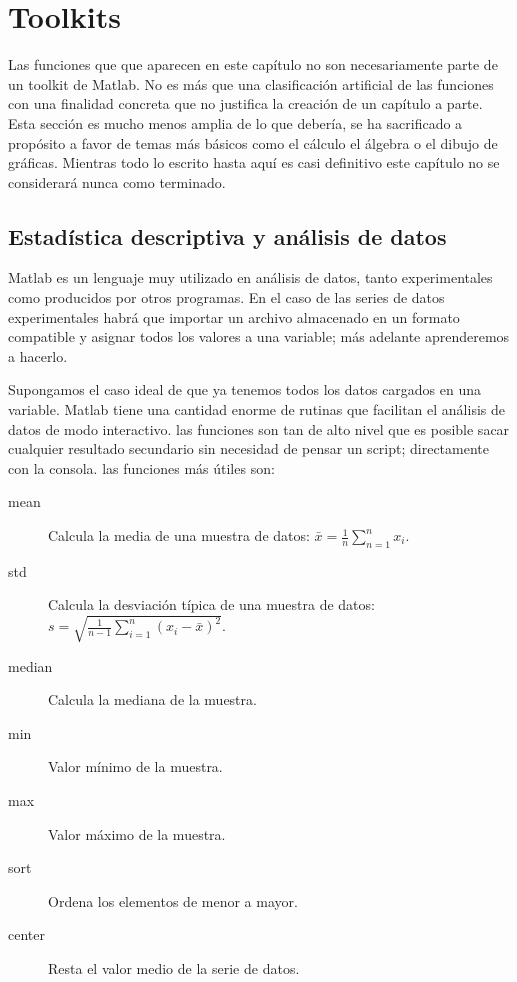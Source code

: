 \chapter{Toolkits}

Las funciones que que aparecen en este capítulo no son necesariamente
parte de un toolkit de Matlab. No es más que una clasificación artificial
de las funciones con una finalidad concreta que no justifica la creación
de un capítulo a parte. Esta sección es mucho menos amplia de lo que
debería, se ha sacrificado a propósito a favor de temas más básicos
como el cálculo el álgebra o el dibujo de gráficas. Mientras todo
lo escrito hasta aquí es casi definitivo este capítulo no se considerará
nunca como terminado.


\section{Estadística descriptiva y análisis de datos}

Matlab es un lenguaje muy utilizado en análisis de datos, tanto
experimentales como producidos por otros programas. En el caso de las
series de datos experimentales habrá que importar un archivo
almacenado en un formato compatible y asignar todos los valores a una
variable; más adelante aprenderemos a hacerlo.

Supongamos el caso ideal de que ya tenemos todos los datos cargados en
una variable. Matlab tiene una cantidad enorme de rutinas que
facilitan el análisis de datos de modo interactivo. las funciones son
tan de alto nivel que es posible sacar cualquier resultado secundario
sin necesidad de pensar un script; directamente con la consola. las
funciones más útiles son:

\begin{description}
\item [mean]Calcula la media de una muestra de datos:
  $\bar{x}=\frac{1}{n}\sum_{n=1}^{n}x_{i}$.
\item [std]Calcula la desviación típica de una muestra de
  datos: $s=\sqrt{\frac{1}{n-1}\sum_{i=1}^{n}(x_{i}-\bar{x})^{2}}$.
\item [median]Calcula la mediana de la muestra.
\item [min]Valor mínimo de la muestra.
\item [max]Valor máximo de la muestra.
\item [sort]Ordena los elementos de menor a mayor.
\item [center\texttt{}]Resta el valor medio de la serie
  de datos.
\end{description}

